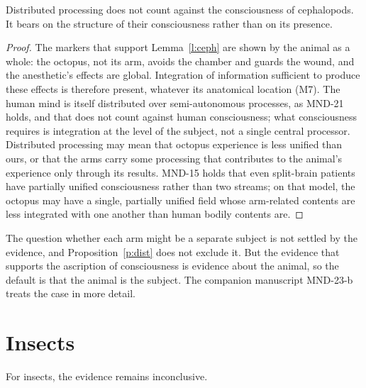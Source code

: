 \documentclass{situationist-preprint}
\begin{document}
\begin{proposition}\label{p:dist}
Distributed processing does not count against the consciousness of cephalopods. It bears on the structure of their consciousness rather than on its presence.
\end{proposition}

\begin{proof}
The markers that support Lemma~\ref{l:ceph} are shown by the animal as a whole: the octopus, not its arm, avoids the chamber and guards the wound, and the anesthetic's effects are global. Integration of information sufficient to produce these effects is therefore present, whatever its anatomical location (M7). The human mind is itself distributed over semi-autonomous processes, as MND-21 holds, and that does not count against human consciousness; what consciousness requires is integration at the level of the subject, not a single central processor. Distributed processing may mean that octopus experience is less unified than ours, or that the arms carry some processing that contributes to the animal's experience only through its results. MND-15 holds that even split-brain patients have partially unified consciousness rather than two streams; on that model, the octopus may have a single, partially unified field whose arm-related contents are less integrated with one another than human bodily contents are.
\end{proof}

The question whether each arm might be a separate subject is not settled by the evidence, and Proposition~\ref{p:dist} does not exclude it. But the evidence that supports the ascription of consciousness is evidence about the animal, so the default is that the animal is the subject. The companion manuscript MND-23-b treats the case in more detail.

\section{Insects}

\begin{lemma}\label{l:insects}
For insects, the evidence remains inconclusive.
\end{lemma}
\end{document}
